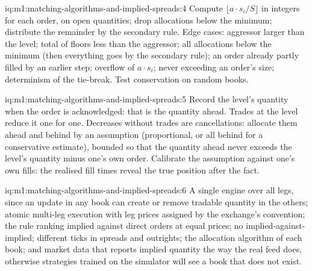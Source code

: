 \begin{solution}{iq:m1:matching-algorithms-and-implied-spreads:4}
Compute $\lfloor a \cdot s_i / S\rfloor$ in integers for each order, on open
quantities; drop allocations below the minimum; distribute the remainder by
the secondary rule. Edge cases: aggressor larger than the level; total of
floors less than the aggressor; all allocations below the minimum (then
everything goes by the secondary rule); an order already partly filled by an
earlier step; overflow of $a \cdot s_i$; never exceeding an order's size;
determinism of the tie-break. Test conservation on random books.
\end{solution}

\begin{solution}{iq:m1:matching-algorithms-and-implied-spreads:5}
Record the level's quantity when the order is acknowledged: that is the
quantity ahead. Trades at the level reduce it one for one. Decreases without
trades are cancellations: allocate them ahead and behind by an assumption
(proportional, or all behind for a conservative estimate), bounded so that
the quantity ahead never exceeds the level's quantity minus one's own order.
Calibrate the assumption against one's own fills: the realised fill times
reveal the true position after the fact.
\end{solution}

\begin{solution}{iq:m1:matching-algorithms-and-implied-spreads:6}
A single engine over all legs, since an update in any book can create or
remove tradable quantity in the others; atomic multi-leg execution with leg
prices assigned by the exchange's convention; the rule ranking implied
against direct orders at equal prices; no implied-against-implied; different
ticks in spreads and outrights; the allocation algorithm of each book; and
market data that reports implied quantity the way the real feed does,
otherwise strategies trained on the simulator will see a book that does not
exist.
\end{solution}
